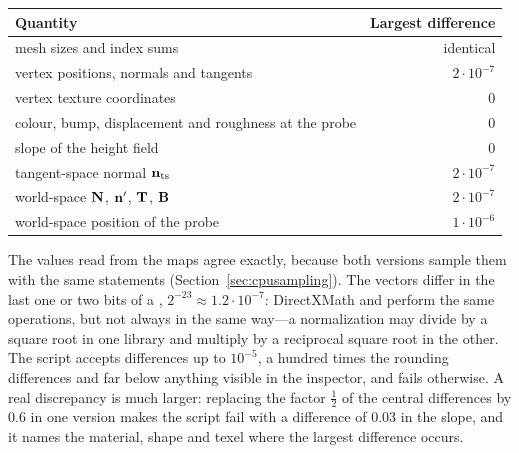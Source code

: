 \begin{center}\small
\begin{tabular}{@{}lr@{}}
\toprule
\textbf{Quantity} & \textbf{Largest difference}\\
\midrule
mesh sizes and index sums & identical\\
vertex positions, normals and tangents & $2\cdot10^{-7}$\\
vertex texture coordinates & $0$\\
colour, bump, displacement and roughness at the probe & $0$\\
slope of the height field & $0$\\
tangent-space normal $\mathbf{n}_{\mathrm{ts}}$ & $2\cdot10^{-7}$\\
world-space $\mathbf{N}$, $\mathbf{n}'$, $\mathbf{T}$, $\mathbf{B}$ & $2\cdot10^{-7}$\\
world-space position of the probe & $1\cdot10^{-6}$\\
\bottomrule
\end{tabular}
\end{center}

The values read from the maps agree exactly, because both versions sample them with the same
statements (Section~\ref{sec:cpusampling}). The vectors differ in the last one or two bits of a
, $2^{-23}\approx1.2\cdot10^{-7}$: DirectXMath and  perform the same
operations, but not always in the same way---a normalization may divide by a square root in one
library and multiply by a reciprocal square root in the other. The script accepts differences up
to $10^{-5}$, a hundred times the rounding differences and far below anything visible in the
inspector, and fails otherwise. A real discrepancy is much larger: replacing the factor
$\frac12$ of the central differences by $0.6$ in one version makes the script fail with a
difference of $0.03$ in the slope, and it names the material, shape and texel where the largest
difference occurs.

